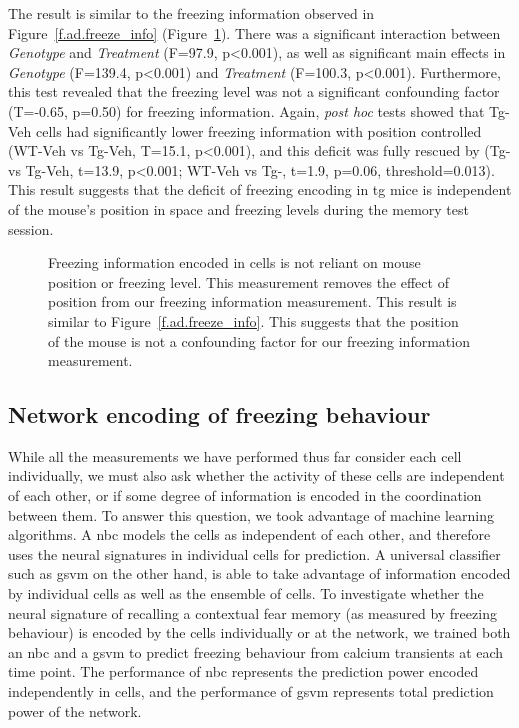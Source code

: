 The result is similar to the freezing information observed in Figure~\ref{f.ad.freeze_info} (Figure~\ref{f.ad.freeze_ctrl}). There was a significant interaction between \textit{Genotype} and \textit{Treatment} (F=97.9, p<0.001), as well as significant main effects in \textit{Genotype} (F=139.4, p<0.001) and \textit{Treatment} (F=100.3, p<0.001). Furthermore, this test revealed that the freezing level was not a significant confounding factor (T=-0.65, p=0.50) for freezing information. Again, \textit{post hoc} tests showed that Tg-Veh cells had significantly lower freezing information with position controlled (WT-Veh vs Tg-Veh, T=15.1, p<0.001), and this deficit was fully rescued by \tglu{} (Tg-\glu{} vs Tg-Veh, t=13.9, p<0.001; WT-Veh vs Tg-\glu, t=1.9, p=0.06, threshold=0.013). This result suggests that the deficit of freezing encoding in \gls{tg} mice is independent of the mouse's position in space and freezing levels during the memory test session.
\begin{figure}[h]
    
    \caption[Position-controlled freezing information.]{Freezing information encoded in cells is not reliant on mouse position or freezing level. This measurement removes the effect of position from our freezing information measurement. This result is similar to Figure~\ref{f.ad.freeze_info}. This suggests that the position of the mouse is not a confounding factor for our freezing information measurement. \label{f.ad.freeze_ctrl}}
\end{figure}



\subsection{Network encoding of freezing behaviour}

While all the measurements we have performed thus far consider each cell individually, we must also ask whether the activity of these cells are independent of each other, or if some degree of information is encoded in the coordination between them. To answer this question, we took advantage of machine learning algorithms. A \gls{nbc} models the cells as independent of each other, and therefore uses the neural signatures in individual cells for prediction. A universal classifier such as \gls{gsvm} on the other hand, is able to take advantage of information encoded by individual cells as well as the ensemble of cells. To investigate whether the neural signature of recalling a contextual fear memory (as measured by freezing behaviour) is encoded by the cells individually or at the network, we trained both an \gls{nbc} and a \gls{gsvm} to predict freezing behaviour from calcium transients at each time point. The performance of \gls{nbc} represents the prediction power encoded independently in cells, and the performance of \gls{gsvm} represents total prediction power of the network.


